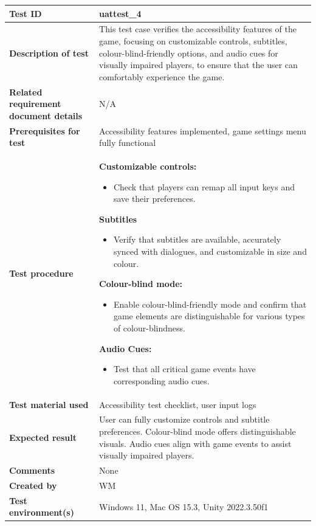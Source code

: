 \documentclass[11pt, a4paper]{article}
\begin{document}
\begin{center}
\begin{tabularx}{\linewidth}{|>{\raggedright\arraybackslash}m{4cm}|X|}
    \hline
    \textbf{Test ID} & uattest\_4 \\
    \hline
    \textbf{Description of test} & This test case verifies the accessibility features of the game, focusing on customizable controls, subtitles, colour-blind-friendly options, and audio cues for visually impaired players, to ensure that the user can comfortably experience the game. \\
    \hline
    \textbf{Related requirement document details} & N/A \\
    \hline
    \textbf{Prerequisites for test} & Accessibility features implemented, game settings menu fully functional \\
    \hline
    \textbf{Test procedure} &
    \textbf{Customizable controls:}
    \begin{itemize}
        \item Check that players can remap all input keys and save their preferences.
    \end{itemize}
    \textbf{Subtitles}
    \begin{itemize}
        \item Verify that subtitles are available, accurately synced with dialogues, and customizable in size and colour.
    \end{itemize}
    \textbf{Colour-blind mode:}
    \begin{itemize}
        \item Enable colour-blind-friendly mode and confirm that game elements are distinguishable for various types of colour-blindness.
    \end{itemize}
    \textbf{Audio Cues:}
    \begin{itemize}
        \item Test that all critical game events have corresponding audio cues.
    \end{itemize}
    \\
    \hline
    \textbf{Test material used} & Accessibility test checklist, user input logs \\
    \hline
    \textbf{Expected result} & User can fully customize controls and subtitle preferences. Colour-blind mode offers distinguishable visuals. Audio cues align with game events to assist visually impaired players. \\
    \hline
    \textbf{Comments} & None \\
    \hline
    \textbf{Created by} & WM \\
    \hline
    \textbf{Test environment(s)} & Windows 11, Mac OS 15.3, Unity 2022.3.50f1 \\
    \hline
\end{tabularx}
\end{center}
\end{document}
